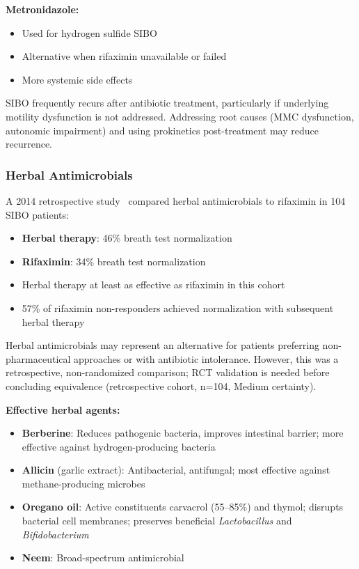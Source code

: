 \textbf{Metronidazole:}
\begin{itemize}
    \item Used for hydrogen sulfide SIBO
    \item Alternative when rifaximin unavailable or failed
    \item More systemic side effects
\end{itemize}

\begin{warning}
SIBO frequently recurs after antibiotic treatment, particularly if underlying motility dysfunction is not addressed. Addressing root causes (MMC dysfunction, autonomic impairment) and using prokinetics post-treatment may reduce recurrence.
\end{warning}

\subsubsection{Herbal Antimicrobials}

\begin{observation}
\label{obs:herbal-sibo}
A 2014 retrospective study~\cite{HerbalSIBO2014} compared herbal antimicrobials to rifaximin in 104 SIBO patients:
\begin{itemize}
    \item \textbf{Herbal therapy}: 46\% breath test normalization
    \item \textbf{Rifaximin}: 34\% breath test normalization
    \item Herbal therapy at least as effective as rifaximin in this cohort
    \item 57\% of rifaximin non-responders achieved normalization with subsequent herbal therapy
\end{itemize}
Herbal antimicrobials may represent an alternative for patients preferring non-pharmaceutical approaches or with antibiotic intolerance. However, this was a retrospective, non-randomized comparison; RCT validation is needed before concluding equivalence (retrospective cohort, n=104, Medium certainty).
\end{observation}

\textbf{Effective herbal agents:}
\begin{itemize}
    \item \textbf{Berberine}: Reduces pathogenic bacteria, improves intestinal barrier; more effective against hydrogen-producing bacteria
    \item \textbf{Allicin} (garlic extract): Antibacterial, antifungal; most effective against methane-producing microbes
    \item \textbf{Oregano oil}: Active constituents carvacrol (55--85\%) and thymol; disrupts bacterial cell membranes; preserves beneficial \textit{Lactobacillus} and \textit{Bifidobacterium}
    \item \textbf{Neem}: Broad-spectrum antimicrobial
\end{itemize}

